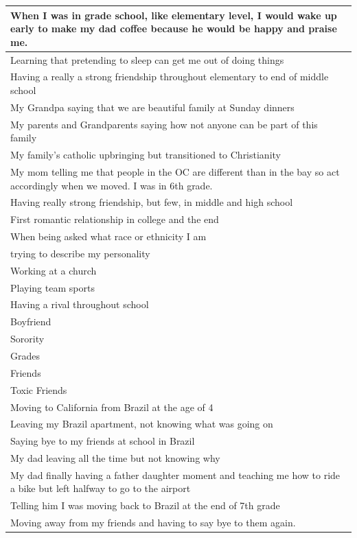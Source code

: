 \documentclass[
  .7em,
  letterpaper,
  DIV=11,
  numbers=noendperiod]{scrartcl}
\begin{document}
\begin{table}
\begin{tabular}{l}
\hline
When I was in grade school, like elementary level, I would wake up early to make my dad coffee because he would be happy and praise me.\\
\hline
Learning that pretending to sleep can get me out of doing things\\
\hline
Having a really a strong friendship throughout elementary to end of middle school\\
\hline
My Grandpa saying that we are beautiful family at Sunday dinners\\
\hline
My parents and Grandparents saying how not anyone can be part of this family\\
\hline
My family's catholic upbringing but transitioned to Christianity\\
\hline
My mom telling me that people in the OC are different than in the bay so act accordingly when we moved. I was in 6th grade.\\
\hline
Having really strong friendship, but few, in middle and high school\\
\hline
First romantic relationship in college and the end\\
\hline
When being asked what race or ethnicity I am\\
\hline
trying to describe my personality\\
\hline
Working at a church\\
\hline
Playing team sports\\
\hline
Having a rival throughout school\\
\hline
Boyfriend\\
\hline
Sorority\\
\hline
Grades\\
\hline
Friends\\
\hline
Toxic Friends\\
\hline
Moving to California from Brazil at the age of 4\\
\hline
Leaving my Brazil apartment, not knowing what was going on\\
\hline
Saying bye to my friends at school in Brazil\\
\hline
My dad leaving all the time but not knowing why\\
\hline
My dad finally having a father daughter moment and teaching me how to ride a bike but left halfway to go to the airport\\
\hline
Telling him I was moving back to Brazil at the end of 7th grade\\
\hline
Moving away from my friends and having to say bye to them again.\\

\end{tabular}
\end{table}
\end{document}
